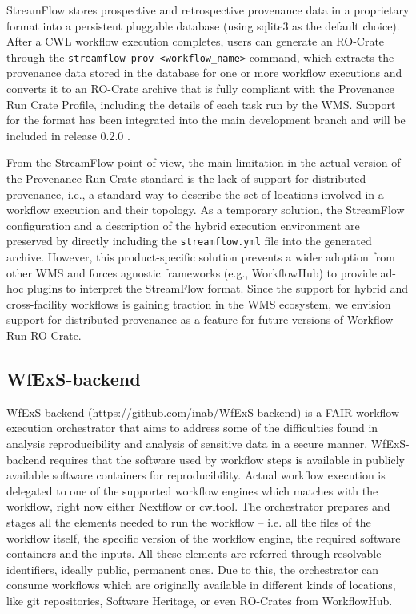 \documentclass[10pt,letterpaper]{article}
\begin{document}
StreamFlow stores prospective and retrospective provenance data in a proprietary format into a persistent pluggable database (using sqlite3 as the default choice).
After a CWL workflow execution completes, users can generate an RO-Crate through the \texttt{streamflow prov <workflow\_name>}
command, which extracts the provenance data stored in the database for one or more workflow executions and converts it to an RO-Crate archive that is fully compliant with the Provenance Run Crate Profile, including the details of each task run by the WMS.
Support for the format has been integrated into the main development branch and will be included in release 0.2.0 \cite{Colonnelli 2023b}.

From the StreamFlow point of view, the main limitation in the actual version of the Provenance Run Crate standard is the lack of support for distributed provenance, i.e., a standard way to describe the set of locations involved in a workflow execution and their topology. As a temporary solution,
the StreamFlow configuration and a description of the hybrid execution environment are preserved by directly including the \texttt{streamflow.yml} file into the generated archive.
However, this product-specific solution prevents a wider adoption from other WMS and forces agnostic frameworks (e.g., WorkflowHub) to provide ad-hoc plugins to interpret the StreamFlow format.
Since the support for hybrid and cross-facility workflows is gaining traction in the WMS ecosystem, we envision support for distributed provenance as a feature for future versions of Workflow Run RO-Crate.

\subsection{WfExS-backend}\label{wfexs}

WfExS-backend (\url{https://github.com/inab/WfExS-backend}) is a FAIR workflow execution orchestrator that aims to address some of the difficulties found in analysis reproducibility and analysis of sensitive data in a secure manner.
WfExS-backend requires that the software used by workflow steps is available in publicly available software containers for reproducibility.
Actual workflow execution is delegated to one of the supported workflow engines which matches with the workflow, right now either Nextflow or cwltool.
The orchestrator prepares and stages all the elements needed to run the workflow -- i.e. all the files of the workflow itself, the specific version of the workflow engine, the required software containers and the inputs.
All these elements are referred through resolvable identifiers, ideally public, permanent ones.
Due to this, the orchestrator can consume workflows which are originally available in different kinds of locations, like git repositories, Software Heritage, or even RO-Crates from WorkflowHub.
\end{document}
